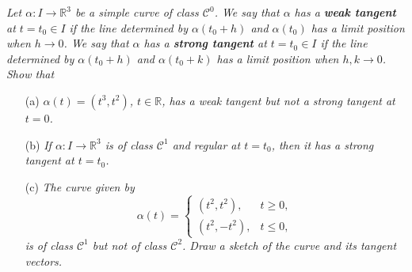 \documentclass{article}
\begin{document}
\emph{Let $\alpha: I \to \mathbb{R}^3$ be a simple curve of class $\mathcal{C}^{0}$.
We say that $\alpha$ has a \textbf{weak tangent} at $t = t_0 \in I$ if
the line determined by $\alpha(t_0 + h)$ and $\alpha(t_0)$ has a limit position when $h \to 0$.
We say that $\alpha$ has a \textbf{strong tangent} at $t = t_0 \in I$ if
the line determined by $\alpha(t_0 + h)$ and $\alpha(t_0 + k)$ has a limit position when $h, k \to 0$.
Show that}
\begin{enumerate}
\item[(a)]
  \emph{$\alpha(t) = (t^3,t^2)$, $t \in \mathbb{R}$, has a weak tangent
  but not a strong tangent at $t = 0$.}

\item[(b)]
  \emph{If $\alpha: I \to \mathbb{R}^3$ is of class $\mathcal{C}^{1}$ and
  regular at $t = t_0$, then it has a strong tangent at $t = t_0$.}

\item[(c)]
  \emph{The curve given by
  \begin{equation*}
    \alpha(t) =
    \begin{cases}
       (t^2,t^2), & t \geq 0, \\
       (t^2,-t^2), & t \leq 0,
    \end{cases}
  \end{equation*}
  is of class $\mathcal{C}^{1}$ but not of class $\mathcal{C}^{2}$.
  Draw a sketch of the curve and its tangent vectors.} \\
\end{enumerate}
\end{document}
